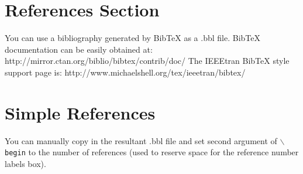 \documentclass[lettersize,journal]{IEEEtran}
\begin{document}



\section{References Section}
You can use a bibliography generated by BibTeX as a .bbl file.
 BibTeX documentation can be easily obtained at:
 http://mirror.ctan.org/biblio/bibtex/contrib/doc/
 The IEEEtran BibTeX style support page is:
 http://www.michaelshell.org/tex/ieeetran/bibtex/

%
%
\section{Simple References}
You can manually copy in the resultant .bbl file and set second argument of $\backslash${\tt{begin}} to the number of references
 (used to reserve space for the reference number labels box).
\end{document}

